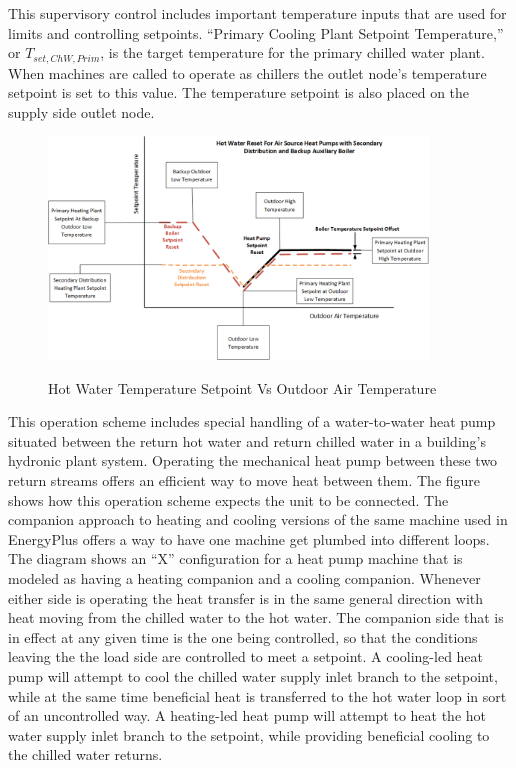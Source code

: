 This supervisory control includes important temperature inputs that are used for limits and controlling setpoints.  ``Primary Cooling Plant Setpoint Temperature,'' or ${T_{set, ChW, Prim}}$, is the target temperature for the primary chilled water plant.  When machines are called to operate as chillers the outlet node's temperature setpoint is set to this value.  The temperature setpoint is also placed on the supply side outlet node. 
\begin{figure}[hbtp]
\centering
\includegraphics[width=0.9\textwidth, height=0.9\textheight, keepaspectratio=true]{media/HW_reset.png}
\caption{Hot Water Temperature Setpoint Vs Outdoor Air Temperature} \protect \label{fig:HW-reset-aux-backup-setpoint-reset}
\end{figure}
This operation scheme includes special handling of a water-to-water heat pump situated between the return hot water and return chilled water in a building's hydronic plant system.  Operating the mechanical heat pump between these two return streams offers an efficient way to move heat between them.  The figure shows how this operation scheme expects the unit to be connected. The companion approach to heating and cooling versions of the same machine used in EnergyPlus offers a way to have one machine get plumbed into different loops.  The diagram shows an ``X'' configuration for a heat pump machine that is modeled as having a heating companion and a cooling companion.  Whenever either side is operating the heat transfer is in the same general direction with heat moving from the chilled water to the hot water.  The companion side that is in effect at any given time is the one being controlled, so that the conditions leaving the the load side are controlled to meet a setpoint.  A cooling-led heat pump will attempt to cool the chilled water supply inlet branch to the setpoint, while at the same time beneficial heat is transferred to the hot water loop in sort of an uncontrolled way.  A heating-led heat pump will attempt to heat the hot water supply inlet branch to the setpoint, while providing beneficial cooling to the chilled water returns. 
